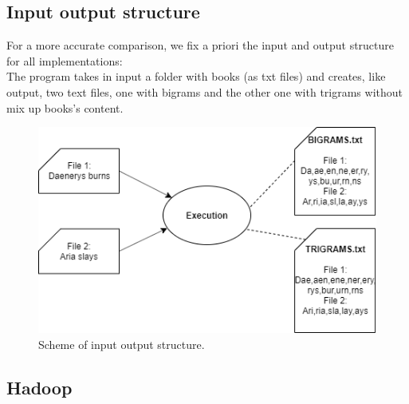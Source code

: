 \documentclass[10pt,twocolumn,letterpaper]{article}
\begin{document}
\vspace{5cm}
\subsection{Input output structure}

For a more accurate comparison, we fix a priori the input and output structure for all implementations:\\ 
The program takes in input a folder with books (as txt files) and creates, like output, two text files, one with bigrams and the other one  with trigrams without mix up books's content.\\

\begin{figure}[H]
\includegraphics[width=\columnwidth]{template/latex/task.png}
\begin{center}
\caption{Scheme of input output structure.}
\label{fig:short}
\end{center}
\end{figure}
\subsection{Hadoop}
\end{document}
